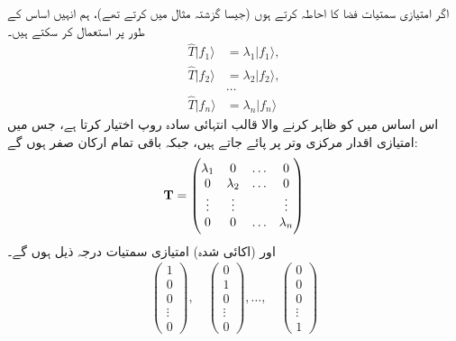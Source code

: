 اگر امتیازی سمتیات فضا کا احاطہ کرتے ہوں (جیسا گزشتہ مثال میں کرتے تھے)،   ہم انہیں اساس کے طور پر استعمال کر سکتے ہیں۔
\begin{align*}
	\hat{T}| f_1\rangle &= \lambda_1| f_1\rangle,\\
	\hat{T}| f_2\rangle &= \lambda_2| f_2\rangle,\\
	&\dots\\
	\hat{T}| f_n\rangle &= \lambda_n| f_n\rangle
\end{align*}
اس اساس میں  کو ظاہر کرنے والا قالب انتہائی سادہ روپ اختیار کرتا ہے،  جس میں امتیازی اقدار مرکزی وتر پر پائے جاتے ہیں، جبکہ باقی تمام ارکان صفر ہوں گے:
\begin{align}\label{مساوات_ضمیمہ_وتری_قالب}
	\operatorname{\mathbf{T}}=
	\begin{pmatrix}
		\lambda_1 & 0 & \dots & 0\\
		0 & \lambda_2 & \dots & 0\\
		\vdots & \vdots & & \vdots\\
		0 & 0 & \dots & \lambda_n
	\end{pmatrix}
\end{align}
اور  (اکائی شدہ)  امتیازی سمتیات درجہ ذیل ہوں گے۔
\begin{align}
	\begin{pmatrix}
		1\\0\\0\\ \vdots\\0
	\end{pmatrix}
	,\quad 
	\begin{pmatrix}
		0\\1\\0\\\vdots\\0
	\end{pmatrix}
	, \dots,\quad 
	\begin{pmatrix}
		0\\0\\0\\\vdots\\1
	\end{pmatrix}
\end{align}

